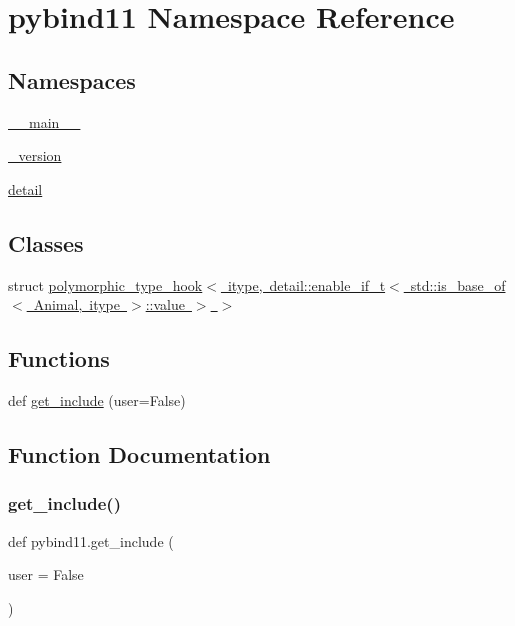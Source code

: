 \hypertarget{namespacepybind11}{}\section{pybind11 Namespace Reference}
\label{namespacepybind11}
\subsection*{Namespaces}
\begin{DoxyCompactItemize}
\item 
 \mbox{\hyperlink{namespacepybind11_1_1____main____}{\+\_\+\+\_\+main\+\_\+\+\_\+}}
\item 
 \mbox{\hyperlink{namespacepybind11_1_1__version}{\+\_\+version}}
\item 
 \mbox{\hyperlink{namespacepybind11_1_1detail}{detail}}
\end{DoxyCompactItemize}
\subsection*{Classes}
\begin{DoxyCompactItemize}
\item 
struct \mbox{\hyperlink{structpybind11_1_1polymorphic__type__hook_3_01itype_00_01detail_1_1enable__if__t_3_01std_1_1is__e83df67915b55f3d6bd9d21e755ef80f}{polymorphic\+\_\+type\+\_\+hook$<$ itype, detail\+::enable\+\_\+if\+\_\+t$<$ std\+::is\+\_\+base\+\_\+of$<$ Animal, itype $>$\+::value $>$ $>$}}
\end{DoxyCompactItemize}
\subsection*{Functions}
\begin{DoxyCompactItemize}
\item 
def \mbox{\hyperlink{namespacepybind11_ac9480bd048b45b1cba07888398918648}{get\+\_\+include}} (user=False)
\end{DoxyCompactItemize}


\subsection{Function Documentation}
\mbox{\label{namespacepybind11_ac9480bd048b45b1cba07888398918648}} 
\subsubsection{\texorpdfstring{get\_include()}{get\_include()}}
{\footnotesize\ttfamily def pybind11.\+get\+\_\+include (\begin{DoxyParamCaption}\item[{}]{user = {\ttfamily False} }\end{DoxyParamCaption})}

